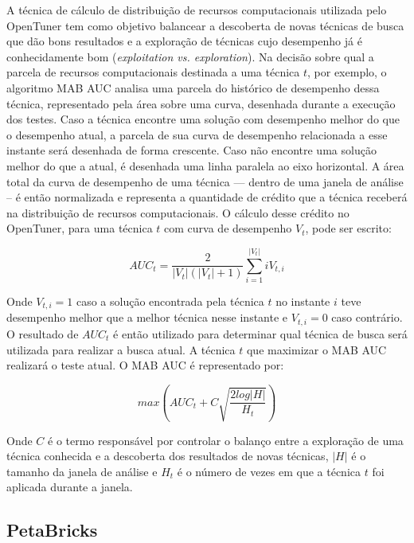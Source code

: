 \documentclass[a4paper, 12pt]{article}
\begin{document}
A técnica de cálculo de distribuição de recursos computacionais utilizada
pelo OpenTuner tem como objetivo balancear a descoberta de novas técnicas
de busca que dão bons resultados e a exploração de técnicas cujo desempenho
já é conhecidamente bom (\emph{exploitation vs. exploration}). Na decisão sobre
qual a parcela de recursos computacionais destinada a uma técnica $t$, por
exemplo, o algoritmo MAB AUC analisa uma parcela do histórico de desempenho
dessa técnica, representado pela área sobre uma curva, desenhada durante a
execução dos testes. Caso a técnica encontre uma solução com desempenho melhor
do que o desempenho atual, a parcela de sua curva de desempenho relacionada a
esse instante será desenhada de forma crescente. Caso não encontre uma solução
melhor do que a atual, é desenhada uma linha paralela ao eixo horizontal. A
área total da curva de desempenho de uma técnica --- dentro de uma janela de
análise -- é então normalizada e representa a quantidade de crédito que a
técnica receberá na distribuição de recursos computacionais. O cálculo desse
crédito no OpenTuner, para uma técnica $t$ com curva de desempenho $V_t$, pode
ser escrito:

\begin{equation*}
    AUC_t = \frac{2} {|V_t|(|V_t|+1)} \sum_{i=1}^{|V_t|} iV_{t,i}
\end{equation*}

Onde $V_{t,i} = 1$ caso a solução encontrada pela técnica $t$ no instante
$i$ teve desempenho melhor que a melhor técnica nesse instante e
$V_{t,i} = 0$ caso contrário. O resultado de $AUC_t$ é então utilizado para
determinar qual técnica de busca será utilizada para realizar a busca atual.
A técnica $t$ que maximizar o MAB AUC realizará o teste atual. O MAB AUC é
representado por:

\begin{equation*}
    max \left( AUC_t + C\sqrt{\frac{2log|H|}{H_t}} \right)
\end{equation*}

Onde $C$ é o termo responsável por controlar o balanço entre a exploração de
uma técnica conhecida e a descoberta dos resultados de novas técnicas, $|H|$ é
o tamanho da janela de análise e $H_t$ é o número de vezes em que a técnica $t$
foi aplicada durante a janela.

\subsection{PetaBricks} \label{sec:peta}
\end{document}
